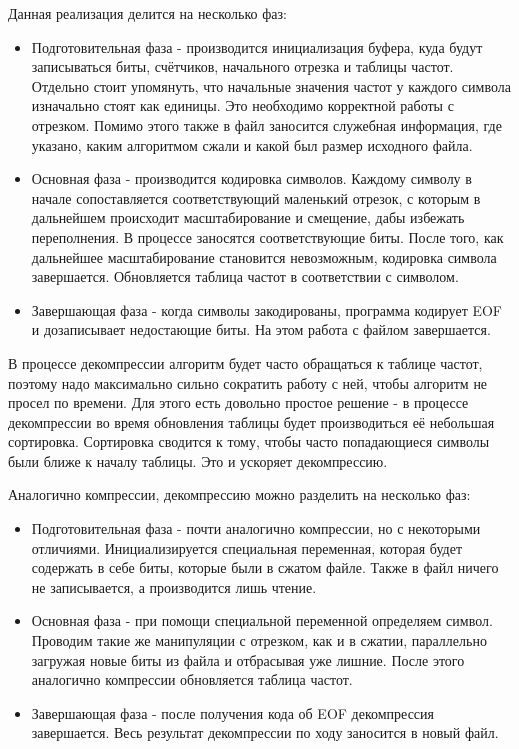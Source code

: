\documentclass[12pt]{article}
\begin{document}
Данная реализация делится на несколько фаз:
\begin{itemize}
	\item Подготовительная фаза - производится инициализация буфера, куда будут записываться биты, счётчиков, начального отрезка и таблицы частот. Отдельно стоит упомянуть, что начальные значения частот у каждого символа изначально стоят как единицы. Это необходимо корректной работы с отрезком. Помимо этого также в файл заносится служебная информация, где указано, каким алгоритмом сжали и какой был размер исходного файла.
	\item Основная фаза - производится кодировка символов. Каждому символу в начале сопоставляется соответствующий маленький отрезок, с которым в дальнейшем происходит масштабирование и смещение, дабы избежать переполнения. В процессе заносятся соответствующие биты. После того, как дальнейшее масштабирование становится невозможным, кодировка символа завершается. Обновляется таблица частот в соответствии с символом.
	\item Завершающая фаза - когда символы закодированы, программа кодирует EOF и дозаписывает недостающие биты. На этом работа с файлом завершается.
\end{itemize}

В процессе декомпрессии алгоритм будет часто обращаться к таблице частот, поэтому надо максимально сильно сократить работу с ней, чтобы алгоритм не просел по времени. Для этого есть довольно простое решение - в процессе декомпрессии во время обновления таблицы будет производиться её небольшая сортировка. Сортировка сводится к тому, чтобы часто попадающиеся символы были ближе к началу таблицы. Это и ускоряет декомпрессию.

Аналогично компрессии, декомпрессию можно разделить на несколько фаз:
\begin{itemize}
	\item Подготовительная фаза - почти аналогично компрессии, но с некоторыми отличиями. Инициализируется специальная переменная, которая будет содержать в себе биты, которые были в сжатом файле. Также в файл ничего не записывается, а производится лишь чтение.
	\item Основная фаза - при помощи специальной переменной определяем символ. Проводим такие же манипуляции с отрезком, как и в сжатии, параллельно загружая новые биты из файла и отбрасывая уже лишние. После этого аналогично компрессии обновляется таблица частот.
	\item Завершающая фаза - после получения кода об EOF декомпрессия завершается. Весь результат декомпрессии по ходу заносится в новый файл.
\end{itemize}
\end{document}
